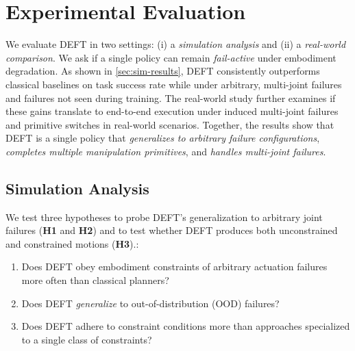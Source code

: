 \section{Experimental Evaluation}
We evaluate DEFT in two settings: (i) a \emph{simulation analysis} and (ii) a \emph{real-world comparison}. We ask if a single policy can remain \emph{fail-active} under embodiment degradation. As shown in \cref{sec:sim-results}, \textsc{DEFT} consistently outperforms classical baselines on task success rate while under arbitrary, multi-joint failures and failures not seen during training. The real-world study further examines if these gains translate to end-to-end execution under induced multi-joint failures and primitive switches in real-world scenarios. Together, the results show that DEFT is a single policy that \emph{generalizes to arbitrary failure configurations}, \emph{completes multiple manipulation primitives}, and \emph{handles multi-joint failures}.
 \vspace{-5pt}

\subsection{Simulation Analysis} \label{sec:sim-analysis}
We test three hypotheses to probe DEFT’s generalization to arbitrary joint failures (\textbf{H1} and \textbf{H2}) and to test whether DEFT produces both unconstrained and constrained motions (\textbf{H3}).:

\begin{enumerate}[label=\textbf{H.\arabic*}]
\item Does DEFT obey embodiment constraints of arbitrary actuation failures more often than classical planners?
\item Does DEFT \emph{generalize} to out-of-distribution (OOD) failures?
\item Does DEFT adhere to constraint conditions more than approaches specialized to a single class of constraints?
\end{enumerate}



